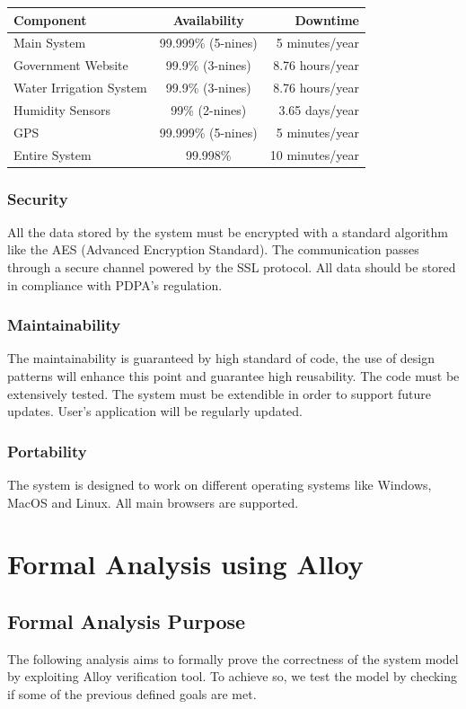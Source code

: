 \documentclass[table, 12pt]{article}
\begin{document}
\begin{table}[H]
    \begin{center}
      \label{tab:availability}
      \begin{tabular}{l|c|r}
        \textbf{Component} & \textbf{Availability} & \textbf{Downtime}\\
        \hline
        Main System & 99.999\% (5-nines) & 5 minutes/year\\
        Government Website & 99.9\% (3-nines) & 8.76 hours/year\\
        Water Irrigation System & 99.9\% (3-nines) & 8.76 hours/year\\
        Humidity Sensors & 99\% (2-nines) & 3.65 days/year\\
        GPS & 99.999\% (5-nines) & 5 minutes/year\\
        \hline
        Entire System & 99.998\% & 10 minutes/year
      \end{tabular}
    \end{center}
\end{table}

\subsubsection{Security}
All the data stored by the system must be encrypted with a standard algorithm like the AES (Advanced Encryption Standard).
The communication passes through a secure channel powered by the SSL protocol.
All data should be stored in compliance with PDPA's regulation.
\subsubsection{Maintainability}
The maintainability is guaranteed by high standard of code, the use of design patterns will enhance this point and guarantee high reusability.
The code must be extensively tested.
The system must be extendible in order to support future updates.
User's application will be regularly updated.
\subsubsection{Portability}
The system is designed to work on different operating systems like Windows, MacOS and Linux.
All main browsers are supported.
\newpage
\section{Formal Analysis using Alloy}
\subsection{Formal Analysis Purpose}
The following analysis aims to formally prove the correctness of the system model by exploiting Alloy verification tool. To achieve so, we test the model by checking if some of the previous defined goals are met. 
\end{document}
